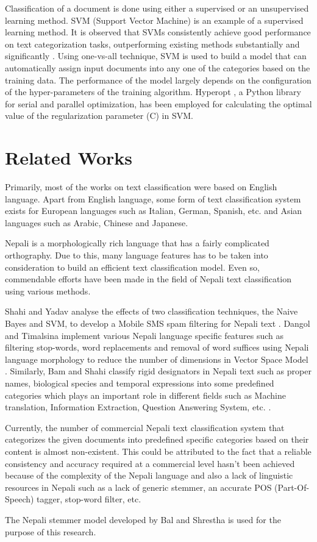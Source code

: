 \documentclass[fleqn --11pt --twoside]{IOEGC2016} %
\begin{document}
\par Classification of a document is done using either a supervised or an unsupervised learning method. SVM (Support Vector Machine) is an example of a supervised learning method. It is observed that SVMs consistently achieve good performance on text categorization tasks, outperforming existing methods substantially and significantly \cite{joachims1998text}. Using one-vs-all technique, SVM is used to build a model that can automatically assign input documents into any one of the categories based on the training data. The performance of the model largely depends on the configuration of the hyper-parameters of the training algorithm. Hyperopt \cite{bergstra2013making}, a Python library for serial and parallel optimization,  has been employed for calculating the optimal value of the regularization parameter (C) in SVM.
\section{Related Works}
Primarily, most of the works on text classification were based on English language. Apart from English language, some form of text classification system exists for European languages such as Italian, German, Spanish, etc. and Asian languages such as Arabic, Chinese and Japanese.
\par
Nepali is a morphologically rich language that has a fairly complicated orthography. Due to this, many language features has to be taken into consideration to build an efficient text classification model. Even so, commendable efforts have been made in the field of Nepali text classification using various methods.
\par
Shahi and Yadav analyse the effects of two classification techniques, the Naive Bayes and SVM, to develop a Mobile SMS spam filtering for Nepali text \cite{shahi2013mobile}.
Dangol and Timalsina implement various Nepali language specific features such as filtering stop-words, word replacements and removal of word suffices using Nepali language morphology to reduce the number of dimensions in Vector Space Model \cite{dangol2013features}. 
Similarly, Bam and Shahi classify rigid designators in Nepali text such as proper names, biological species and temporal expressions into some predefined categories which plays an important role in different fields such as Machine translation, Information Extraction, Question Answering System, etc. \cite{bam2014named}. 
\par
Currently, the number of commercial Nepali text classification system that categorizes the given documents into predefined specific categories based on their content is almost non-existent. This could be attributed to the fact that a reliable consistency and accuracy required at a commercial level hasn't been achieved because of the complexity of the Nepali language and also a lack of linguistic resources in Nepali such as a lack of generic stemmer, an accurate POS (Part-Of-Speech) tagger, stop-word filter, etc.
\par
The Nepali stemmer model developed by Bal and Shrestha \cite{bal2004morphological} is used for the purpose of this research.
\end{document}
